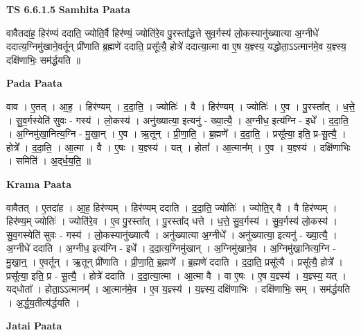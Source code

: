 \documentclass[17pt]{extarticle}
\begin{document}
\textbf{TS 6.6.1.5 } \newline
\textbf{Samhita Paata} \newline

वावैतदा॑ह॒ हिर॑ण्यं ददाति॒ ज्योति॒र्वै हिर॑ण्यं॒ ज्योति॑रे॒व पु॒रस्ता᳚द्धत्ते सुव॒र्गस्य॑ लो॒कस्यानु॑ख्यात्या अ॒ग्नीधे॑ ददात्य॒ग्निमु॑खाने॒वर्तून् प्री॑णाति ब्र॒ह्मणे॑ ददाति॒ प्रसू᳚त्यै॒ होत्रे॑ ददात्या॒त्मा वा ए॒ष य॒ज्ञ्स्य॒ यद्धोता॒ऽऽत्मान॑मे॒व य॒ज्ञ्स्य॒ दक्षि॑णाभिः॒ सम॑र्द्धयति ॥ \newline

\textbf{Pada Paata} \newline

वाव । ए॒तत् । आ॒ह॒ । हिर॑ण्यम् । द॒दा॒ति॒ । ज्योतिः॑ । वै । हिर॑ण्यम् । ज्योतिः॑ । ए॒व । पु॒रस्ता᳚त् । ध॒त्ते॒ । सु॒व॒र्गस्येति॑ सुवः - गस्य॑ । लो॒कस्य॑ । अनु॑ख्यात्या॒ इत्यनु॑ - ख्या॒त्यै॒ । अ॒ग्नीध॒ इत्य॑ग्नि - इधे᳚ । द॒दा॒ति॒ । अ॒ग्निमु॑खा॒नित्य॒ग्नि - मु॒खा॒न् । ए॒व । ऋ॒तून् । प्री॒णा॒ति॒ । ब्र॒ह्मणे᳚ । द॒दा॒ति॒ । प्रसू᳚त्या॒ इति॒ प्र-सू॒त्यै॒ । होत्रे᳚ । द॒दा॒ति॒ । आ॒त्मा । वै । ए॒षः । य॒ज्ञ्स्य॑ । यत् । होता᳚ । आ॒त्मान᳚म् । ए॒व । य॒ज्ञ्स्य॑ । दक्षि॑णाभिः । समिति॑ । अ॒द्‌र्ध॒य॒ति॒ ॥  \newline


\textbf{Krama Paata} \newline

वावैतत् । ए॒तदा॑ह । आ॒ह॒ हिर॑ण्यम् । हिर॑ण्यम् ददाति । द॒दा॒ति॒ ज्योतिः॑ । ज्योति॒र् वै । वै हिर॑ण्यम् । हिर॑ण्य॒म् ज्योतिः॑ । ज्योति॑रे॒व । ए॒व पु॒रस्ता᳚त् । पु॒रस्ता᳚द् धत्ते । ध॒त्ते॒ सु॒व॒र्गस्य॑ । सु॒व॒र्गस्य॑ लो॒कस्य॑ । सु॒व॒गस्येति॑ सुवः - गस्य॑ । लो॒कस्यानु॑ख्यात्यै । अनु॑ख्यात्या अ॒ग्नीधे᳚ । अनु॑ख्यात्या॒ इत्यनु॑ - ख्या॒त्यै॒ । अ॒ग्नीधे॑ ददाति । अ॒ग्नीध॒ इत्य॑ग्नि - इधे᳚ । द॒दा॒त्य॒ग्निमु॑खान् । अ॒ग्निमु॑खाने॒व । अ॒ग्निमु॑खा॒नित्य॒ग्नि - मु॒खा॒न्॒ । ए॒वर्तून् । ऋ॒तून् प्री॑णाति । प्री॒णा॒ति॒ ब्र॒ह्मणे᳚ । ब्र॒ह्मणे॑ ददाति । द॒दा॒ति॒ प्रसू᳚त्यै । प्रसू᳚त्यै॒ होत्रे᳚ । प्रसू᳚त्या॒ इति॒ प्र - सू॒त्यै॒ । होत्रे॑ ददाति । द॒दा॒त्या॒त्मा । आ॒त्मा वै । वा ए॒षः । ए॒ष य॒ज्ञ्स्य॑ । य॒ज्ञ्स्य॒ यत् । यद्‌धोता᳚ । होता॒ऽऽत्मानम्᳚ । आ॒त्मान॑मे॒व । ए॒व य॒ज्ञ्स्य॑ । य॒ज्ञ्स्य॒ दक्षि॑णाभिः । दक्षि॑णाभिः॒ सम् । सम॑र्द्धयति । अ॒र्द्ध॒य॒तीत्य॑र्द्धयति । \newline

\textbf{Jatai Paata} \newline
\end{document}
